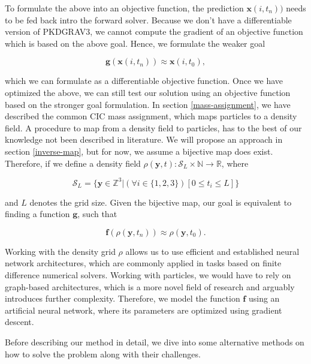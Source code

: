 \documentclass{article}
\begin{document}
To formulate the above into an objective function, the prediction $\mathbf{x}(i, t_{n}))$ needs to be fed back intro the forward solver. Because we don't have a differentiable version of PKDGRAV3, we cannot compute the gradient of an objective function which is based on the above goal. Hence, we formulate the weaker goal

\begin{equation}
    \mathbf{g}(\mathbf{x}(i, t_{n})) \approx \mathbf{x}(i, t_{0}),
\end{equation}

which we can formulate as a differentiable objective function. Once we have optimized the above, we can still test our solution using an objective function based on the stronger goal formulation. In section \ref{mass-assignment}, we have described the common CIC mass assignment, which maps particles to a density field. A procedure to map from a density field to particles, has to the best of our knowledge not been described in literature. We will propose an approach in section \ref{inverse-map}, but for now, we assume a bijective map does exist. Therefore, if we define a density field $\rho(\mathbf{y}, t) \colon \mathcal{S}_{L} \times \mathbb{N} \rightarrow \mathbb{R}$, where

\begin{equation}
    \mathcal{S}_{L} = \{ \mathbf{y} \in \mathbb{Z}^3 | (\forall i \in \{1, 2, 3\}) [0 \leq t_i \leq L] \}
\end{equation} 

and $L$ denotes the grid size. Given the bijective map, our goal is equivalent to finding a function $\mathbf{g}$, such that

\begin{equation}
    \mathbf{f}(\rho(\mathbf{y}, t_{n})) \approx \rho(\mathbf{y}, t_{0}).
\end{equation}

Working with the density grid $\rho$ allows us to use efficient and established neural network architectures, which are commonly applied in tasks based on finite difference numerical solvers. Working with particles, we would have to rely on graph-based architectures, which is a more novel field of research and arguably introduces further complexity. Therefore, we model the function $\mathbf{f}$ using an artificial neural network, where its parameters are optimized using gradient descent.

Before describing our method in detail, we dive into some alternative methods on how to solve the problem along with their challenges. 
\end{document}
